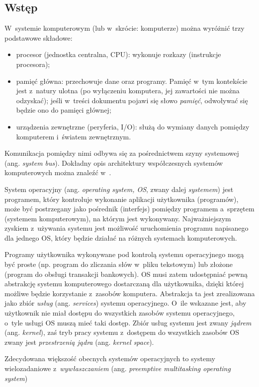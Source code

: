 \documentclass[12pt]{mwart}
\begin{document}
\subsection{Wstęp}
\indent 
	W~systemie komputerowym (lub w~skrócie: komputerze) można wyróżnić trzy podstawowe składowe:
	\begin{itemize}
		\item procesor (jednostka centralna, CPU): wykonuje rozkazy (instrukcje procesora);
		\item pamięć główna: przechowuje dane oraz programy. Pamięć w~tym kontekście jest z~natury ulotna (po wyłączeniu komputera,
			jej zawartości nie można odzyskać); jeśli w~treści dokumentu pojawi się słowo \emph{pamięć}, odwoływać się będzie ono do
			pamięci głównej;
		\item urządzenia zewnętrzne (peryferia, I/O): służą do wymiany danych pomiędzy komputerem i~światem zewnętrznym.
	\end{itemize}
	Komunikacja pomiędzy nimi odbywa się za pośrednictwem szyny systemowej (ang. \emph{system bus}).
	Dokładny opis architektury współczesnych
	systemów komputerowych można znaleźć w~\cite{hennessy}.
\par
\indent
	System operacyjny (ang. \emph{operating system, OS}, zwany dalej \emph{systemem}) jest programem, 
	który kontroluje wykonanie aplikacji użytkownika (programów),
	może być postrzegany jako pośrednik (interfejs) pomiędzy programem a~sprzętem (systemem komputerowym), na którym jest wykonywany.
	Najważniejszym zyskiem z~używania systemu jest możliwość uruchomienia programu napisanego dla jednego OS, który będzie działać na różnych systemach komputerowych.
\par
%
\indent
	Programy użytkownika wykonywane pod kontrolą systemu operacyjnego mogą być proste (np. program do zliczania słów w~pliku tekstowym)
	lub złożone (program do obsługi transakcji bankowych). OS musi zatem udostępniać pewną abstrakcję systemu komputerowego dostarczaną dla użytkownika,
  dzięki której możliwe będzie korzystanie z~zasobów komputera. Abstrakcja ta jest zrealizowana jako zbiór \emph{usług} (ang. \emph{services}) systemu operacyjnego.
  O~ile wskazane jest, aby użytkownik nie miał dostępu do wszystkich zasobów systemu operacyjnego, o~tyle usługi OS muszą mieć taki dostęp.
  Zbiór usług systemu jest zwany \emph{jądrem} (ang. \emph{kernel}), zaś tryb pracy systemu z~dostępem do wszystkich zasobów OS zwany jest
  \emph{przestrzenią jądra} (ang. \emph{kernel space}).
\par
%
\indent
  Zdecydowana większość obecnych systemów operacyjnych to systemy wielozadaniowe z~\emph{wywłaszczaniem} (ang. \emph{pre\dywiz emptive multitasking operating system})
\end{document}
